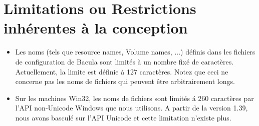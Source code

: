 \section{Limitations ou Restrictions inh\'erentes \`a la conception}

\begin{itemize}
\item Les noms (tels que resource names, Volume names, ...) d\'efinis dans les
   fichiers  de configuration de Bacula sont limit\'es \`a un nombre fix\'e de
   caract\`eres.  Actuellement, la limite est d\'efinie \`a 127 caract\`eres.
Notez que ceci ne concerne  pas les noms de fichiers qui peuvent \^etre
arbitrairement longs.  
\item Sur les machines Win32, les noms de fichiers sont limit\'es \'a 260 caract\`eres 
   par l'API non-Unicode Windows que nous utilisons. A partir de la version 1.39, 
   nous avons bascul\'e sur l'API Unicode et cette limitation n'existe plus.
\end{itemize}
